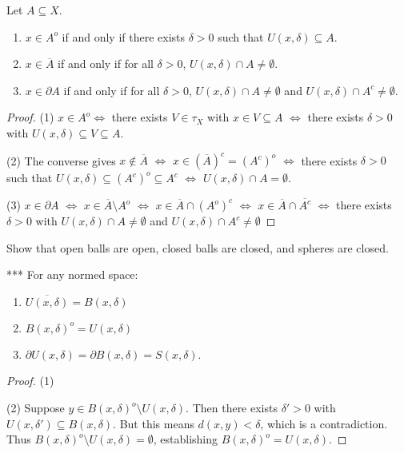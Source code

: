     \begin{proposition}
        Let $A \subseteq X$.
        \begin{enumerate}[label = (\arabic*),itemsep=1pt,topsep=3pt]
            \item $x \in A^o$ if and only if there exists $\delta > 0$ such that $U(x , \delta) \subseteq A$.
            \item $x \in \overline{A}$ if and only if for all $\delta > 0$, $U(x,\delta) \cap A \neq \emptyset$.
            \item $x \in \partial A$ if and only if for all $\delta > 0$, $U(x,\delta) \cap A \neq \emptyset$ and $U(x,\delta) \cap A^c \neq \emptyset$.
        \end{enumerate}
    \end{proposition}
        \begin{proof}
            (1) $x \in A^o \iff $ there exists $V \in \tau_X$ with $x \in V \subseteq A$ $\iff$ there exists $\delta > 0$ with $U(x,\delta) \subseteq V \subseteq A$.

            (2) The converse gives $x \not\in \overline{A}$ $\iff$ $x \in (\overline{A})^c = (A^c)^o$ $\iff$ there exists $\delta > 0$ such that $U(x,\delta) \subseteq (A^c)^o \subseteq A^c$ $\iff$ $U(x,\delta) \cap A = \emptyset$.

            (3) $x \in \partial A$ $\iff$ $x \in \overline{A} \setminus A^o$ $\iff$ $x \in \overline{A} \cap (A^o)^c$ $\iff$ $x \in \overline{A} \cap \overline{A^c}$ $\iff$ there exists $\delta > 0$ with $U(x,\delta) \cap A \neq \emptyset$ and $U(x,\delta) \cap A^c \neq \emptyset$
        \end{proof}

    \begin{exercise}
        Show that open balls are open, closed balls are closed, and spheres are closed.
    \end{exercise}

    \begin{proposition}***
        For any normed space:
            \begin{enumerate}[label = (\arabic*),itemsep=1pt,topsep=3pt]
                \item $\overline{U(x,\delta)} = B(x,\delta)$
                \item $B(x,\delta)^o = U(x,\delta)$ 
                \item $\partial U(x,\delta) = \partial B(x,\delta) = S(x,\delta)$.
            \end{enumerate}
    \end{proposition}
        \begin{proof}
            (1)

            (2) Suppose $y \in B(x,\delta)^o \setminus U(x,\delta)$. Then there exists $\delta' > 0$ with $U(x,\delta') \subseteq B(x,\delta)$. But this means $d(x,y) < \delta$, which is a contradiction. Thus $ B(x,\delta)^o \setminus U(x,\delta) = \emptyset$, establishing $B(x,\delta)^o = U(x,\delta)$. 
        \end{proof}

